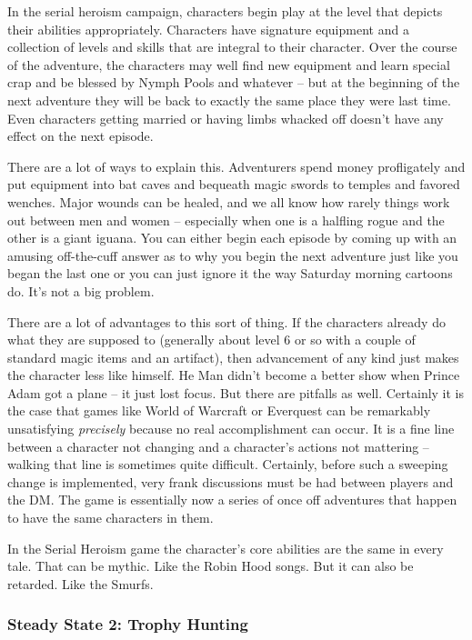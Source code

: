 In the serial heroism campaign, characters begin play at the level that depicts their abilities appropriately. Characters have signature equipment and a collection of levels and skills that are integral to their character. Over the course of the adventure, the characters may well find new equipment and learn special crap and be blessed by Nymph Pools and whatever -- but at the beginning of the next adventure they will be back to exactly the same place they were last time. Even characters getting married or having limbs whacked off doesn't have any effect on the next episode.

There are a lot of ways to explain this. Adventurers spend money profligately and put equipment into bat caves and bequeath magic swords to temples and favored wenches. Major wounds can be healed, and we all know how rarely things work out between men and women -- especially when one is a halfling rogue and the other is a giant iguana. You can either begin each episode by coming up with an amusing off-the-cuff answer as to why you begin the next adventure just like you began the last one or you can just ignore it the way Saturday morning cartoons do. It's not a big problem.

There are a lot of advantages to this sort of thing. If the characters already do what they are supposed to (generally about level 6 or so with a couple of standard magic items and an artifact), then advancement of any kind just makes the character less like himself. He Man didn't become a better show when Prince Adam got a plane -- it just lost focus. But there are pitfalls as well. Certainly it is the case that games like World of Warcraft or Everquest can be remarkably unsatisfying \textit{precisely} because no real accomplishment can occur. It is a fine line between a character not changing and a character's actions not mattering -- walking that line is sometimes quite difficult. Certainly, before such a sweeping change is implemented, very frank discussions must be had between players and the DM. The game is essentially now a series of once off adventures that happen to have the same characters in them.

In the Serial Heroism game the character's core abilities are the same in every tale. That can be mythic. Like the Robin Hood songs. But it can also be retarded. Like the Smurfs.

\subsubsection{Steady State 2: Trophy Hunting}
\vspace*{-8pt}

